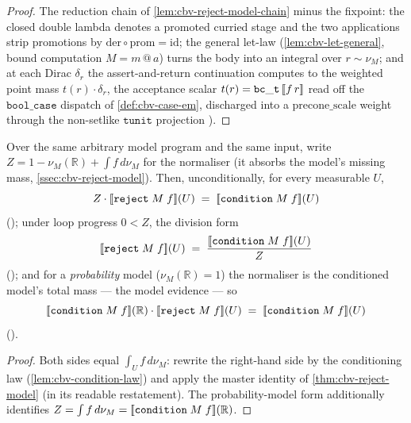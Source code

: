 \begin{proof}
The reduction chain of \autoref{lem:cbv-reject-model-chain} minus the
fixpoint: the closed double lambda denotes a promoted curried stage
and the two applications strip promotions by
$\mathrm{der} \circ \mathrm{prom} = \mathrm{id}$; the general let-law
(\autoref{lem:cbv-let-general}, bound computation $M = m\,@\,a$)
turns the body into an integral over $r \sim \nu_M$; and at each
Dirac $\delta_r$ the assert-and-return continuation computes to the
weighted point mass $t(r)\cdot\delta_r$, the acceptance scalar
$t(r) = \mathtt{bc\_t}\,[\![ f\,r ]\!]$ read off the $\mathtt{bool\_case}$
dispatch of \autoref{def:cbv-case-em}, discharged into a
$\mathrm{precone\_scale}$ weight through the non-setlike
$\mathtt{tunit}$ projection
).
\end{proof}

\begin{theorem}\label{thm:cbv-condition-reject}
\rocqok
{}\rocqok
{}\rocqok
{}
Over the same arbitrary model program and the same input, write
$Z = 1 - \nu_M(\mathbb{R}) + \int f\,d\nu_M$ for the normaliser (it
absorbs the model's missing mass, \autoref{ssec:cbv-reject-model}).
Then, unconditionally, for every
measurable $U$,
\[
  Z \cdot [\![ \mathtt{reject}\;M\;f ]\!](U)
  \;=\;
  [\![ \mathtt{condition}\;M\;f ]\!](U)
\]
();
under loop progress $0 < Z$, the division form
\[
  [\![ \mathtt{reject}\;M\;f ]\!](U)
  \;=\;
  \frac{[\![ \mathtt{condition}\;M\;f ]\!](U)}{Z}
\]
();
and for a \emph{probability} model ($\nu_M(\mathbb{R}) = 1$) the
normaliser is the conditioned model's total mass --- the model
evidence --- so
\[
  [\![ \mathtt{condition}\;M\;f ]\!](\mathbb{R})
  \cdot [\![ \mathtt{reject}\;M\;f ]\!](U)
  \;=\;
  [\![ \mathtt{condition}\;M\;f ]\!](U)
\]
().
\end{theorem}

\begin{proof}
Both sides equal $\int_U f\,d\nu_M$: rewrite the right-hand side by
the conditioning law (\autoref{lem:cbv-condition-law}) and apply the
master identity of \autoref{thm:cbv-reject-model} (in its readable
restatement). The probability-model form additionally identifies
$Z = \int f\,d\nu_M = [\![ \mathtt{condition}\;M\;f ]\!](\mathbb{R})$.
\end{proof}


